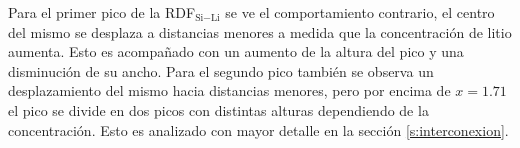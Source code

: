 Para el primer pico de la RDF$_{\text{Si}-\text{Li}}$ se ve el comportamiento contrario, el 
centro del mismo se desplaza a distancias menores a medida que la concentración
de litio aumenta. Esto es acompañado con un aumento de la altura del pico y una
disminución de su ancho. Para el segundo pico también se observa un desplazamiento
del mismo hacia distancias menores, pero por encima de $x = 1.71$ el pico se
divide en dos picos con distintas alturas dependiendo de la concentración. Esto
es analizado con mayor detalle en la sección \ref{s:interconexion}.
